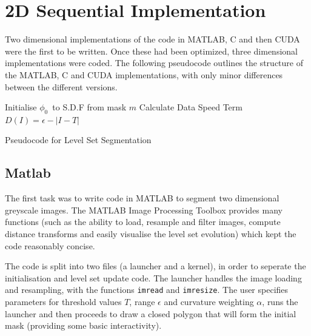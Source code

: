 \section{2D Sequential Implementation}
Two dimensional implementations of the code in MATLAB, C and then CUDA were the first to be written. Once these had been optimized, three dimensional implementations were coded. The following pseudocode outlines the structure of the MATLAB, C and CUDA implementations, with only minor differences between the different versions.

\begin{algorithm}[h]
\dontprintsemicolon
{}
\BlankLine
\SetLine
Initialise $\phi_0$\ to S.D.F from mask $m$\;
Calculate Data Speed Term $D(I)= \epsilon - |I-T|$\;
\caption{Pseudocode for Level Set Segmentation}\label{alg:alg}
\end{algorithm}


	\subsection{Matlab}
The first task was to write code in MATLAB to segment two dimensional greyscale images. The MATLAB Image Processing Toolbox provides many functions (such as the ability to load, resample and filter images, compute distance transforms and easily visualise the level set evolution) which kept the code reasonably concise. 

The code is split into two files (a launcher and a kernel), in order to seperate the initialisation and level set update code. The launcher handles the image loading and resampling, with the functions \texttt{imread} and \texttt{imresize}. The user specifies parameters for threshold values $T$, range $\epsilon$ and curvature weighting $\alpha$, runs the launcher and then proceeds to draw a closed polygon that will form the initial mask (providing some basic interactivity). 

